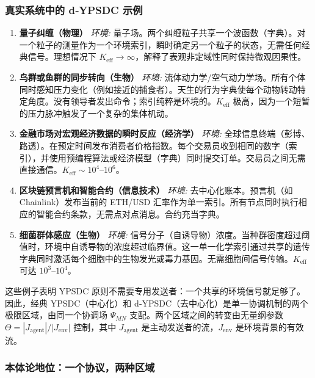 \documentclass[11pt,a4paper]{article}
\begin{document}
	\subsubsection*{真实系统中的 d‑YPSDC 示例}
	
	\begin{enumerate}[leftmargin=*]
		\item \textbf{量子纠缠（物理）}
		\textit{环境:} 量子场。两个纠缠粒子共享一个波函数（字典）。对一个粒子的测量作为一个环境索引，瞬时确定另一个粒子的状态，无需任何经典信号。理想情况下 $K_{\mathrm{eff}}\to\infty$，解释了表观非定域性同时保持微观因果性。
		
		\item \textbf{鸟群或鱼群的同步转向（生物）}
		\textit{环境:} 流体动力学/空气动力学场。所有个体同时感知压力变化（例如接近的捕食者）。天生的行为字典使每个动物转动特定角度。没有领导者发出命令；索引纯粹是环境的。$K_{\mathrm{eff}}$ 极高，因为一个短暂的压力脉冲触发了一个复杂的集体机动。
		
		\item \textbf{金融市场对宏观经济数据的瞬时反应（经济学）}
		\textit{环境:} 全球信息终端（彭博、路透）。在预定时间发布消费者价格指数。每个交易员收到相同的数字（索引），并使用预编程算法或经济模型（字典）同时提交订单。交易员之间无需直接通信。$K_{\mathrm{eff}}\sim 10^{4}$--$10^{6}$。
		
		\item \textbf{区块链预言机和智能合约（信息技术）}
		\textit{环境:} 去中心化账本。预言机（如 Chainlink）发布当前的 ETH/USD 汇率作为单一索引。所有节点同时执行相应的智能合约条款，无需点对点消息。合约充当字典。
		
		\item \textbf{细菌群体感应（生物）}
		\textit{环境:} 信号分子（自诱导物）浓度。当种群密度超过阈值时，环境中自诱导物的浓度超过临界值。这一单一化学索引通过共享的遗传字典同时激活每个细胞中的生物发光或毒力基因。无需细胞间信号传输。$K_{\mathrm{eff}}$ 可达 $10^{3}$--$10^{4}$。
	\end{enumerate}
	
	这些例子表明 YPSDC 原则不需要专用发送者：一个共享的环境信号就足够了。因此，经典 YPSDC（中心化）和 d‑YPSDC（去中心化）是单一协调机制的两个极限区域，由同一个协调场 $\Psi_{MN}$ 支配。两个区域之间的转变由无量纲参数 $\Theta = |J_{\mathrm{agent}}|/|J_{\mathrm{env}}|$ 控制，其中 $J_{\mathrm{agent}}$ 是主动发送者的流，$J_{\mathrm{env}}$ 是环境背景的有效流。
	
	\subsubsection*{本体论地位：一个协议，两种区域}
	
\end{document}
